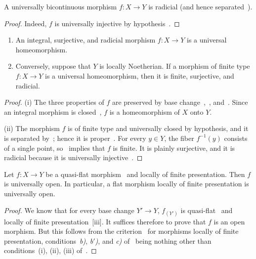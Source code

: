 \begin{proposition}[2.4.4]
\label{IV.2.4.4}
A universally bicontinuous morphism $f:X\to Y$ is radicial \textnormal{(}and hence separated~\textnormal{)}.
\end{proposition}

\begin{proof}
Indeed, $f$ is universally injective by hypothesis~.
\end{proof}

\begin{proposition}[2.4.5]
\label{IV.2.4.5}
\medskip\noindent
\begin{enumerate}
  \item[(i)] An integral, surjective, and radicial morphism $f:X\to Y$ is a universal homeomorphism.
  \item[(ii)] Conversely, suppose that $Y$ is locally Noetherian. If a morphism of finite type $f:X\to Y$ is a universal homeomorphism, then it is finite, surjective, and radicial.
\end{enumerate}
\end{proposition}

\begin{proof}
(i) The three properties of $f$ are preserved by base change~,~, and~. Since an integral morphism is closed~, $f$ is a homeomorphism of $X$ onto $Y$.

(ii) The morphism $f$ is of finite type and universally closed by hypothesis, and it is separated by~; hence it is proper~. For every $y\in Y$, the fiber $f^{-1}(y)$ consists of a single point, so~ implies that $f$ is finite. It is plainly surjective, and it is radicial because it is universally injective~.
\end{proof}

\begin{theorem}[2.4.6]
\label{IV.2.4.6}
Let $f:X\to Y$ be a quasi-flat morphism~ and locally of finite presentation.
Then $f$ is universally open.
In particular, a flat morphism locally of finite presentation is universally open.
\end{theorem}

\begin{proof}
We know that for every base change $Y'\to Y$, $f_{(Y')}$ is quasi-flat~ and locally of finite presentation~[iii].
It suffices therefore to prove that $f$ is an
open morphism.
But this follows from the criterion~ for morphisms locally of finite presentation, conditions~\emph{b)}, \emph{b$'$)}, and \emph{c)} of~ being nothing other than conditions~(i), (ii), (iii) of~.
\end{proof}

